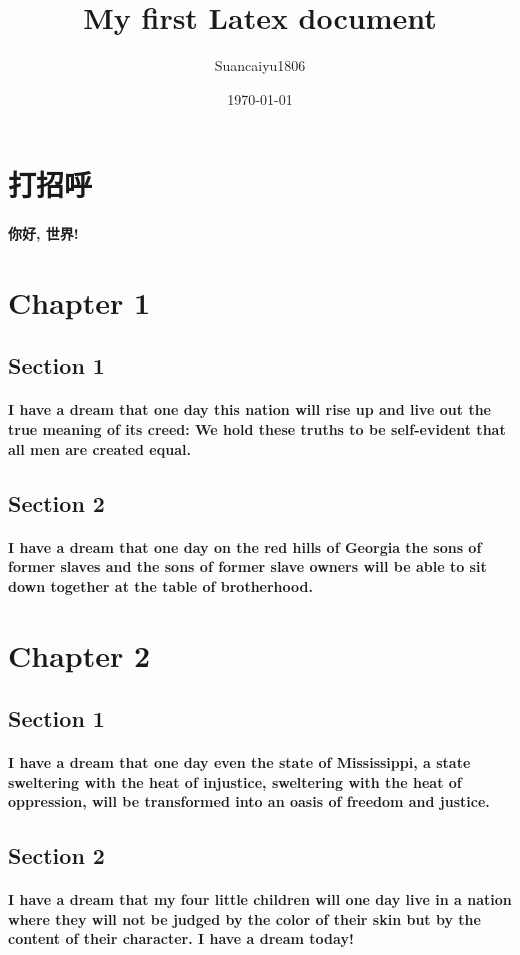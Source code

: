 \documentclass{article}
\title{My first Latex document}
\author{Suancaiyu1806}
\date{\today}
\begin{document}
\maketitle

\thispagestyle{empty}

\newpage

\tableofcontents

\newpage
\section{打招呼}
\paragraph{你好, 世界!}

\newpage
\section{Chapter 1}

\subsection{Section 1}
\paragraph{I have a dream that one day this nation will rise up and live out the true meaning of its creed: We hold these truths to be self-evident that all men are created equal.}

\subsection{Section 2}
\paragraph{I have a dream that one day on the red hills of Georgia the sons of former slaves and the sons of former slave owners will be able to sit down together at the table of brotherhood.}

\section{Chapter 2}

\subsection{Section 1}
\paragraph{I have a dream that one day even the state of Mississippi, a state sweltering with the heat of injustice, sweltering with the heat of oppression, will be transformed into an oasis of freedom and justice.}

\subsection{Section 2}
\paragraph{I have a dream that my four little children will one day live in a nation where they will not be judged by the color of their skin but by the content of their character. I have a dream today!}
\end{document}
